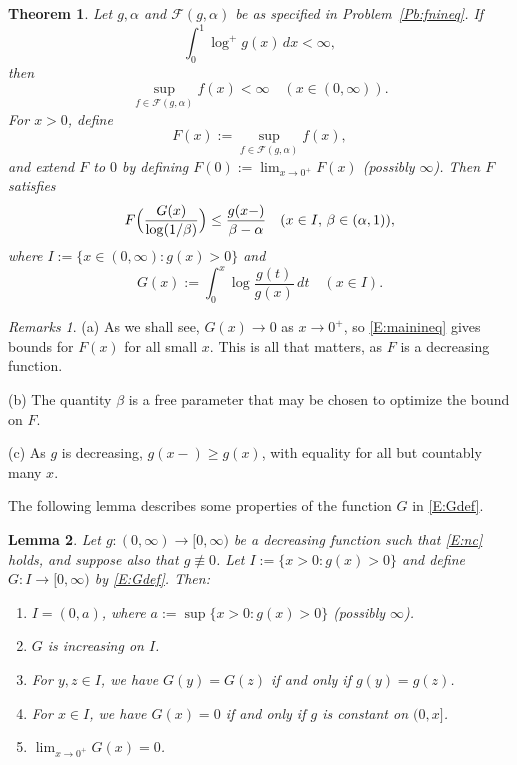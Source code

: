 \documentclass[11pt,reqno]{amsart}
\theoremstyle{plain}
\newtheorem{theorem}{Theorem}[section]
\newtheorem{lemma}[theorem]{Lemma}
\theoremstyle{definition}
\theoremstyle{remark}
\newtheorem*{remarks}{Remarks}
\newcommand{\cF}{\mathcal{F}}
\begin{document}
\begin{theorem}\label{T:main}
Let $g,\alpha$ and $\cF(g,\alpha)$ be as specified in Problem~\ref{Pb:fnineq}.
If
\begin{equation}\label{E:nc}
\int_0^1 \log^+g(x)\,dx<\infty,
\end{equation}
then
\begin{equation}\label{E:supfinite}
\sup_{f\in\cF(g,\alpha)}f(x)<\infty \quad(x\in(0,\infty)).
\end{equation}
For $x>0$, define 
\[
F(x):=\sup_{f\in\cF(g,\alpha)}f(x),
\]
and extend $F$ to $0$ by defining  $F(0):=\lim_{x\to0^+}F(x)$ (possibly $\infty$).
Then $F$ satisfies
\begin{equation}\label{E:mainineq}
F\Bigl(\frac{G(x)}{\log(1/\beta)}\Bigr)
\le \frac{g(x-)}{\beta-\alpha}\quad(x\in I,\,\beta\in(\alpha,1)),
\end{equation}
where $I:=\{x\in(0,\infty):g(x)>0\}$ and
\begin{equation}\label{E:Gdef}
G(x):=\int_0^x \log\frac{g(t)}{g(x)}\,dt \quad(x\in I).
 \end{equation}
\end{theorem}


\begin{remarks}
(a) As we shall see, $G(x)\to0$ as $x\to 0^+$, so
\eqref{E:mainineq} gives bounds for $F(x)$ for all small $x$.
This is all that matters, as $F$ is a decreasing function.

(b) The quantity $\beta$ is a free parameter that may be
chosen to optimize the bound on $F$.

(c) 
As $g$ is decreasing,  $g(x-)\ge g(x)$, with equality
for all but countably many $x$.
\end{remarks}

The following lemma describes some properties 
of the function $G$ in \eqref{E:Gdef}.


\begin{lemma}\label{L:G}
Let $g:(0,\infty)\to[0,\infty)$ be a decreasing function
such that \eqref{E:nc} holds, and suppose also that $g\not\equiv0$.
Let $I:=\{x>0:g(x)>0\}$ and
define $G:I\to[0,\infty)$ by \eqref{E:Gdef}.
Then:
\begin{enumerate}[\normalfont(i)]
\item\label{Gi:0} $I=(0,a)$, where $a:=\sup\{x>0:g(x)>0\}$ (possibly $\infty$).
\item\label{Gi:1} $G$ is increasing on $I$.
\item\label{Gi:2} For $y,z\in I$, we have $G(y)=G(z)$ if and only if  $g(y)=g(z)$.
\item\label{Gi:3} For $x\in I$, we have $G(x)=0$ if and only if $g$ is constant on $(0,x]$.
\item\label{Gi:4} $\lim_{x\to0^+}G(x)=0$.
\end{enumerate}
\end{lemma}
\end{document}
